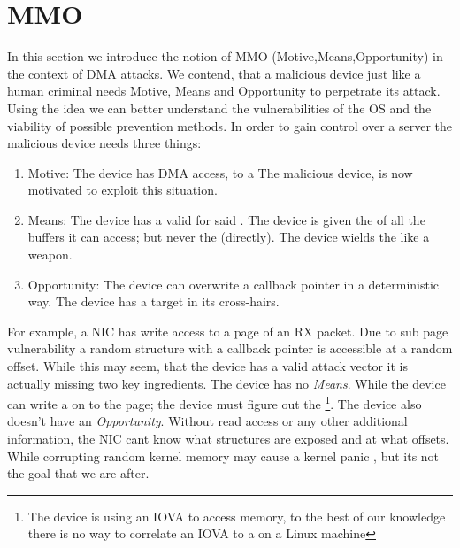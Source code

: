 \section{MMO}\label{sec:mmo}
In this section we introduce the notion of MMO (Motive,Means,Opportunity) in the context of DMA attacks. We contend, that a malicious device just like a human criminal needs Motive, Means and Opportunity to perpetrate its attack. Using the idea we can better understand the vulnerabilities of the OS and the viability of possible prevention methods. In order to gain control over a server the malicious device needs three things:
\begin{enumerate}
    \item Motive: The device has DMA access, to a \mabaf The malicious device, is now motivated to exploit this situation. 
    \item Means: The device has a valid \kva for said \mabaf. The device is given the \iova of all the buffers it can access; but never the \kva{} (directly). The device wields the \kva like a weapon.
    \item Opportunity: The device can overwrite a callback pointer in a deterministic way. The device has a target in its cross-hairs.
\end{enumerate}
For example, a NIC has write access to a page of an RX packet. Due to sub page vulnerability a random structure with a callback pointer is accessible at a random offset. While this may seem, that the device has a valid attack vector it is actually missing two key ingredients. The device has no \textit{Means}. While the device can write a \mabaf on to the page; the device must figure out the \kva\footnote{The device is using an IOVA to access memory, to the best of our knowledge there is no way to correlate an IOVA to a \kva on a Linux machine}. The device also doesn't have an \textit{Opportunity}. Without  read access or any other additional information, the NIC cant know what structures are exposed and at what offsets. While corrupting random kernel memory may cause a kernel panic \cite{MMT16}, but its not the goal that we are after.

